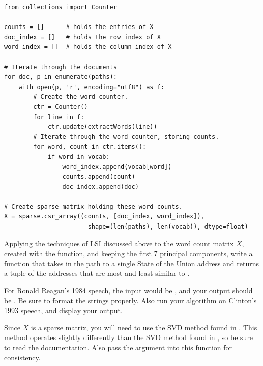 \begin{lstlisting}
from collections import Counter

counts = []      # holds the entries of X
doc_index = []   # holds the row index of X
word_index = []  # holds the column index of X

# Iterate through the documents
for doc, p in enumerate(paths):
    with open(p, 'r', encoding="utf8") as f:
        # Create the word counter.
        ctr = Counter()
        for line in f:
            ctr.update(extractWords(line))
        # Iterate through the word counter, storing counts.
        for word, count in ctr.items():
            if word in vocab:
                word_index.append(vocab[word])
                counts.append(count)
                doc_index.append(doc)

# Create sparse matrix holding these word counts.
X = sparse.csr_array((counts, [doc_index, word_index]),
                       shape=(len(paths), len(vocab)), dtype=float)
\end{lstlisting}

\begin{problem} %
Applying the techniques of LSI discussed above to the word count matrix $X$, created with the  function, and keeping the first 7 principal components, write a function that takes in the path to a single State of the Union address  and returns a tuple of the addresses that are most and least similar to .

For Ronald Reagan's 1984 speech, the input would be , and your output should be .
Be sure to format the strings properly. 
Also run your algorithm on Clinton's 1993 speech, and display your output.

Since $X$ is a sparse matrix, you will need to use the SVD method found in .
This method operates slightly differently than the SVD method found in , so be sure to read the documentation.
Also pass the argument  into this function for consistency.
\label{prob:LSI1}
\end{problem}

